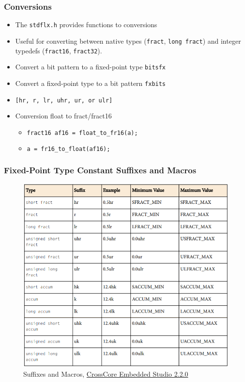 \subsubsection{Conversions}
\begin{itemize}
	\item The \texttt{stdflx.h} provides functions to conversions
	\item Useful for converting between native types (\texttt{fract}, \texttt{long fract}) and integer typedefs (\texttt{fract16}, \texttt{fract32}). 
	\item Convert a bit pattern to a fixed-point type \texttt{bitsfx} \item Convert a fixed-point type to a bit pattern \texttt{fxbits}
	\item \texttt{[hr, r, lr, uhr, ur, or ulr]}
	\item Conversion float to fract/fract16
	\begin{itemize}
		\item \texttt{fract16 af16 = float_to_fr16(a);}
		\item \texttt{a = fr16_to_float(af16);}
	\end{itemize} 
\end{itemize}

\subsubsection{Fixed-Point Type Constant Suffixes and Macros}
\begin{figure} [H]
	\centering
	\includegraphics[width=\linewidth]{graphics/24.png}
	\caption{Suffixes and Macros, \href{http://www.analog.com/media/en/dsp-documentation/software-manuals/cces2-2-0_BlackfinCompilerAndLib_mn_rev1-6.pdf}{CrossCore Embedded Studio 2.2.0}}
	\label{fig:24}
\end{figure}

